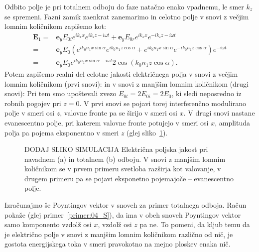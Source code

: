 Odbito polje je pri totalnem odboju do faze natačno enako vpadnemu, le smer $k_z$ se spremeni. 
Fazni zamik zaenkrat zanemarimo in celotno polje v snovi z večjim lomnim količnikom zapišemo kot:
\begin{align}
\mathbf{E}_1 =& \mathbf{e}_{y} E_{0i} e^{ik_x x}e^{ik_z z -i \omega t} +
\mathbf{e}_{y} E_{0r} e^{ik_x x}e^{-ik_z z -i \omega t} \nonumber\\
=& \mathbf{e}_{y} E_{0} \left(
e^{ik_0n_1x\sin \alpha}e^{ik_0n_1z\cos \alpha}+
e^{ik_0n_1x\sin \alpha}e^{-ik_0n_1z\cos \alpha }\right) e^{-i \omega t} \nonumber\\
=& \mathbf{e}_{y} E_{0} e^{ik_0n_1x\sin \alpha -i\omega t} 2 
\cos \left(k_0 n_1z\cos \alpha \right).
 \label{eq:04_65}
\end{align}
Potem zapišemo realni del celotne jakosti električnega polja v snovi z večjim lomnim 
količnikom (prvi snovi):
in v snovi z manjšim lomnim količnikom (drugi snovi):
Pri tem smo upoštevali zvezo $E_{0t} = 2E_{0i} = 2E_0$, ki sledi neposredno iz 
robnih pogojev pri $z=0$.
V prvi snovi se pojavi torej interferenčno modulirano polje v smeri osi $z$,
valovne fronte pa se širijo v smeri osi $x$.  V drugi snovi nastane
evanescentno polje, pri katerem valovne fronte potujejo v smeri osi $x$, 
amplituda polja pa pojema eksponentno v smeri $z$ (glej sliko~\ref{fig:04_simulacija}).
\begin{figure}[ht]
\centering
\def\svgwidth{140truemm} 
%
\caption{DODAJ SLIKO SIMULACIJA Električna poljska jakost pri navadnem (a) in totalnem (b) odboju.
V snovi z manjšim lomnim količnikom se v prvem primeru svetloba razširja
kot valovanje, v drugem primeru pa se pojavi eksponetno pojemajoče -- evanescentno
polje.}
\label{fig:04_simulacija}
\end{figure}

Izračunajmo še Poyntingov vektor v snoveh za primer totalnega odboja. 
Račun pokaže (glej primer~\ref{primer:04_S}), da 
ima v obeh snoveh Poyntingov vektor samo komponento vzdolž osi $x$,
vzdolž osi $z$ pa ne. To pomeni, da kljub temu da je električno polje v snovi z manjšim lomnim 
količnikom različno od nič, je gostota energijskega toka v smeri
pravokotno na mejno ploskev enaka nič. 


